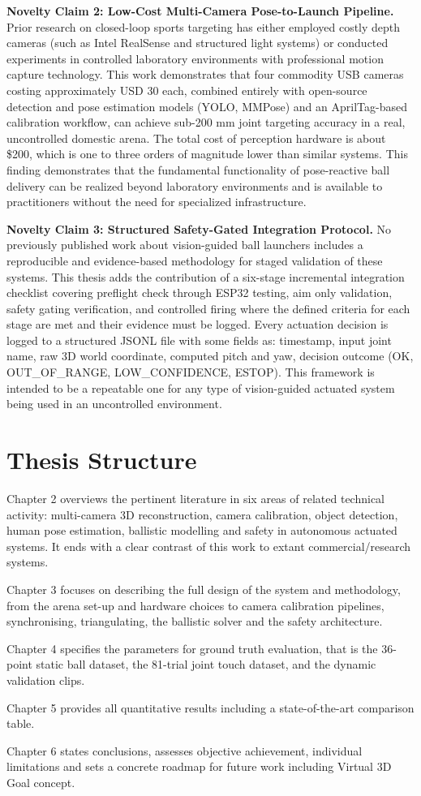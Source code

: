 \textbf{Novelty Claim 2: Low-Cost Multi-Camera Pose-to-Launch Pipeline.}
Prior research on closed-loop sports targeting has either employed costly depth cameras (such as Intel RealSense and structured light systems) or conducted experiments in controlled laboratory environments with professional motion capture technology. This work demonstrates that four commodity USB cameras costing approximately USD 30 each, combined entirely with open-source detection and pose estimation models (YOLO, MMPose) and an AprilTag-based calibration workflow, can achieve sub-200 mm joint targeting accuracy in a real, uncontrolled domestic arena. The total cost of perception hardware is about \$200, which is one to three orders of magnitude lower than similar systems. This finding demonstrates that the fundamental functionality of pose-reactive ball delivery can be realized beyond laboratory environments and is available to practitioners without the need for specialized infrastructure.

\textbf{Novelty Claim 3: Structured Safety-Gated Integration Protocol.}
No previously published work about vision-guided ball launchers includes a reproducible and evidence-based methodology for staged validation of these systems. This thesis adds the contribution of a six-stage incremental integration checklist covering preflight check through ESP32 testing, aim only validation, safety gating verification, and controlled firing where the defined criteria for each stage are met and their evidence must be logged. Every actuation decision is logged to a structured JSONL file with some fields as: timestamp, input joint name, raw 3D world coordinate, computed pitch and yaw, decision outcome (OK, OUT\_OF\_RANGE, LOW\_CONFIDENCE, ESTOP). This framework is intended to be a repeatable one for any type of vision-guided actuated system being used in an uncontrolled environment.

\section{Thesis Structure}

Chapter 2 overviews the pertinent literature in six areas of related technical activity: multi-camera 3D reconstruction, camera calibration, object detection, human pose estimation, ballistic modelling and safety in autonomous actuated systems. It ends with a clear contrast of this work to extant commercial/research systems.

Chapter 3 focuses on describing the full design of the system and methodology, from the arena set-up and hardware choices to camera calibration pipelines, synchronising, triangulating, the ballistic solver and the safety architecture.

Chapter 4 specifies the parameters for ground truth evaluation, that is the 36-point static ball dataset, the 81-trial joint touch dataset, and the dynamic validation clips.

Chapter 5 provides all quantitative results including a state-of-the-art comparison table.

Chapter 6 states conclusions, assesses objective achievement, individual limitations and sets a concrete roadmap for future work including Virtual 3D Goal concept.
